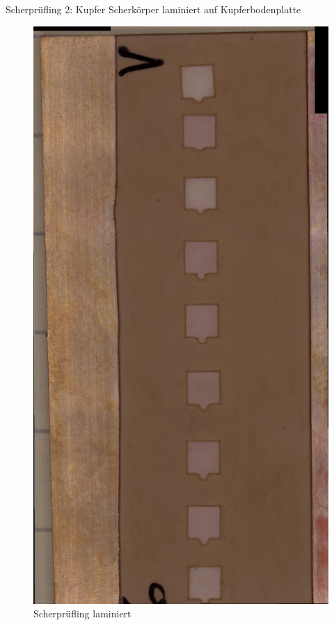 Scherprüfling 2: Kupfer Scherkörper laminiert auf Kupferbodenplatte
\vspace{0.1cm}
\begin{figure}[h]
    \centering
    \includegraphics[scale=0.075, angle=90]{Bilder/Laminieren_Bodenplatte_Gesamt.jpg}
    \caption{Scherprüfling laminiert}
    \vspace{0.2cm}
    \label{Abb.3: Scherprüfling laminiert}
\end{figure}
